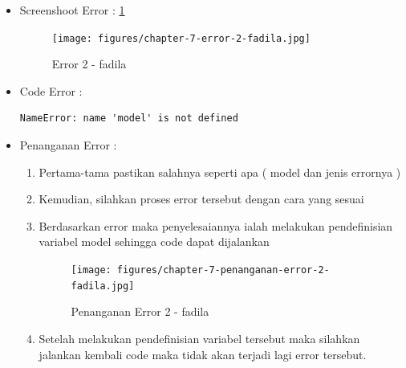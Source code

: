 \begin{enumerate}
\begin{itemize}
\item Screenshoot Error 	: \ref{chapter-7-error-2-fadila}
\par
\par
\begin{figure}[!hbtp]
\centering
\texttt{[image: figures/chapter-7-error-2-fadila.jpg]}
\caption{Error 2 - fadila}
\label{chapter-7-error-2-fadila}
\end{figure}
\par
\item Code Error		:
\begin{lstlisting}
NameError: name 'model' is not defined
\end{lstlisting}
\item Penanganan Error	:
\begin{enumerate}
\item Pertama-tama pastikan salahnya seperti apa ( model dan jenis errornya )
\item Kemudian, silahkan proses error tersebut dengan cara yang sesuai
\item Berdasarkan error maka penyelesaiannya ialah melakukan pendefinisian variabel model sehingga code dapat dijalankan 
\par
\begin{figure}[!hbtp]
\centering
\texttt{[image: figures/chapter-7-penanganan-error-2-fadila.jpg]}
\caption{Penanganan Error 2 - fadila}
\label{chapter-7-penanganan-error-2-fadila}
\end{figure}
\par
\item Setelah melakukan pendefinisian variabel tersebut maka silahkan jalankan kembali code maka tidak akan terjadi lagi error tersebut.
\end{enumerate}
\end{itemize}
\end{enumerate}
\par
\par